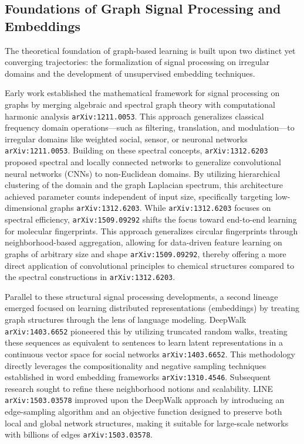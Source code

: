 \documentclass[11pt]{article}
\begin{document}
\subsection{Foundations of Graph Signal Processing and Embeddings}

The theoretical foundation of graph-based learning is built upon two distinct yet converging trajectories: the formalization of signal processing on irregular domains and the development of unsupervised embedding techniques.

Early work established the mathematical framework for signal processing on graphs by merging algebraic and spectral graph theory with computational harmonic analysis \texttt{arXiv:1211.0053}. This approach generalizes classical frequency domain operations—such as filtering, translation, and modulation—to irregular domains like weighted social, sensor, or neuronal networks \texttt{arXiv:1211.0053}. Building on these spectral concepts, \texttt{arXiv:1312.6203} proposed spectral and locally connected networks to generalize convolutional neural networks (CNNs) to non-Euclidean domains. By utilizing hierarchical clustering of the domain and the graph Laplacian spectrum, this architecture achieved parameter counts independent of input size, specifically targeting low-dimensional graphs \texttt{arXiv:1312.6203}. While \texttt{arXiv:1312.6203} focuses on spectral efficiency, \texttt{arXiv:1509.09292} shifts the focus toward end-to-end learning for molecular fingerprints. This approach generalizes circular fingerprints through neighborhood-based aggregation, allowing for data-driven feature learning on graphs of arbitrary size and shape \texttt{arXiv:1509.09292}, thereby offering a more direct application of convolutional principles to chemical structures compared to the spectral constructions in \texttt{arXiv:1312.6203}.

Parallel to these structural signal processing developments, a second lineage emerged focused on learning distributed representations (embeddings) by treating graph structures through the lens of language modeling. DeepWalk \texttt{arXiv:1403.6652} pioneered this by utilizing truncated random walks, treating these sequences as equivalent to sentences to learn latent representations in a continuous vector space for social networks \texttt{arXiv:1403.6652}. This methodology directly leverages the compositionality and negative sampling techniques established in word embedding frameworks \texttt{arXiv:1310.4546}. Subsequent research sought to refine these neighborhood notions and scalability. LINE \texttt{arXiv:1503.03578} improved upon the DeepWalk approach by introducing an edge-sampling algorithm and an objective function designed to preserve both local and global network structures, making it suitable for large-scale networks with billions of edges \texttt{arXiv:1503.03578}.
\end{document}

